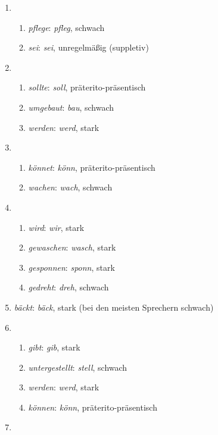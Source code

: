 
\begin{enumerate}\Lf
  \item
    \begin{enumerate}\Lf
      \item \textit{pflege}: \textit{pfleg}, schwach
      \item \textit{sei}: \textit{sei}, unregelmäßig (suppletiv)
    \end{enumerate}
  \item
    \begin{enumerate}\Lf
      \item \textit{sollte}: \textit{soll}, präterito-präsentisch
      \item \textit{umgebaut}: \textit{bau}, schwach
      \item \textit{werden}: \textit{werd}, stark
    \end{enumerate}
  \item
    \begin{enumerate}\Lf
      \item \textit{könnet}: \textit{könn}, präterito-präsentisch
      \item \textit{wachen}: \textit{wach}, schwach
    \end{enumerate}
  \item
    \begin{enumerate}\Lf
      \item \textit{wird}: \textit{wir}, stark
      \item \textit{gewaschen}: \textit{wasch}, stark
      \item \textit{gesponnen}: \textit{sponn}, stark
      \item \textit{gedreht}: \textit{dreh}, schwach
    \end{enumerate}
  \item \textit{bäckt}: \textit{bäck}, stark (bei den meisten Sprechern schwach)
  \item
    \begin{enumerate}\Lf
      \item \textit{gibt}: \textit{gib}, stark
      \item \textit{untergestellt}: \textit{stell}, schwach
      \item \textit{werden}: \textit{werd}, stark
      \item \textit{können}: \textit{könn}, präterito-präsentisch
    \end{enumerate}
  \item
    \begin{enumerate}\Lf

\end{enumerate}
\end{enumerate}
